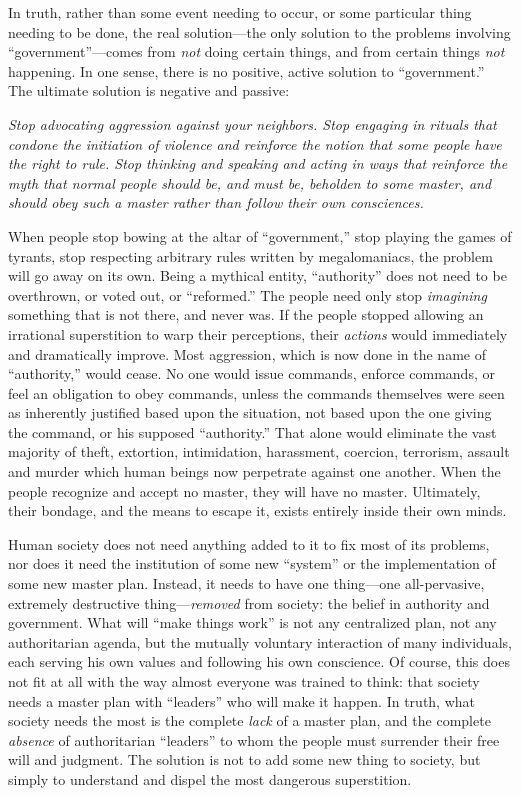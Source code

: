 \documentclass{book}
\begin{document}
In truth, rather than some event needing to occur, or some particular thing needing to be done, the real solution---the only solution to the problems involving \enquote{government}---comes from \emph{not} doing certain things, and from certain things \emph{not} happening. In one sense, there is no positive, active solution to \enquote{government.} The ultimate solution is negative and passive:

\emph{Stop advocating aggression against your neighbors. Stop engaging in rituals that condone the initiation of violence and reinforce the notion that some people have the right to rule. Stop thinking and speaking and acting in ways that reinforce the myth that normal people should be, and must be, beholden to some master, and should obey such a master rather than follow their own consciences.}

When people stop bowing at the altar of \enquote{government,} stop playing the games of tyrants, stop respecting arbitrary rules written by megalomaniacs, the problem will go away on its own. Being a mythical entity, \enquote{authority} does not need to be overthrown, or voted out, or \enquote{reformed.} The people need only stop \emph{imagining} something that is not there, and never was. If the people stopped allowing an irrational superstition to warp their perceptions, their \emph{actions} would immediately and dramatically improve. Most aggression, which is now done in the name of \enquote{authority,} would cease. No one would issue commands, enforce commands, or feel an obligation to obey commands, unless the commands themselves were seen as inherently justified based upon the situation, not based upon the one giving the command, or his supposed \enquote{authority.} That alone would eliminate the vast majority of theft, extortion, intimidation, harassment, coercion, terrorism, assault and murder which human beings now perpetrate against one another. When the people recognize and accept no master, they will have no master. Ultimately, their bondage, and the means to escape it, exists entirely inside their own minds.

Human society does not need anything added to it to fix most of its problems, nor does it need the institution of some new \enquote{system} or the implementation of some new master plan. Instead, it needs to have one thing---one all-pervasive, extremely destructive thing---\emph{removed} from society: the belief in authority and government. What will \enquote{make things work} is not any centralized plan, not any authoritarian agenda, but the mutually voluntary interaction of many individuals, each serving his own values and following his own conscience. Of course, this does not fit at all with the way almost everyone was trained to think: that society needs a master plan with \enquote{leaders} who will make it happen. In truth, what society needs the most is the complete \emph{lack} of a master plan, and the complete \emph{absence} of authoritarian \enquote{leaders} to whom the people must surrender their free will and judgment. The solution is not to add some new thing to society, but simply to understand and dispel the most dangerous superstition.
\end{document}

